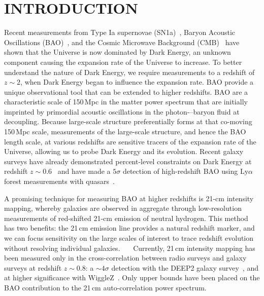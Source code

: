 \documentclass[]{spie}  %
\begin{document}
\section{INTRODUCTION}
\label{sec:intro}  %

Recent measurements from Type Ia supernovae (SN1a)~\cite{SN1a}, Baryon Acoustic Oscillations (BAO)~\cite{2016MNRAS.457.1770C}, and the Cosmic Microwave Background (CMB)~\cite{2015arXiv150201589P} have shown that the Universe is now dominated by Dark Energy, an unknown component causing the expansion rate of the Universe to increase. To better understand the nature of Dark Energy, we require measurements to a redshift of $z\sim2$, when Dark Energy began to influence the expansion rate. BAO provide a unique observational tool that can be extended to higher redshifts. BAO are a characteristic scale of 150\,Mpc in the matter power spectrum that are initially imprinted by primordial acoustic oscillations in the photon-–baryon fluid at decoupling.  Because large-scale structure preferentially forms at that co-moving 150\,Mpc scale, measurements of the large-scale structure, and hence the BAO length scale, at various redshifts are sensitive tracers of the expansion rate of the Universe, allowing us to probe Dark Energy and its evolution.  Recent galaxy surveys have already demonstrated percent-level constraints on Dark Energy at redshift $z\sim0.6$~\cite{2014MNRAS.441...24A} and have made a $5\sigma$ detection of high-redshift BAO using $\mathrm{Ly}\alpha$ forest measurements with quasars~\cite{2015A&A...574A..59D}.\newline

A promising technique for measuring BAO at higher redshifts is 21-cm intensity mapping, whereby galaxies are observed in aggregate through low-resolution measurements of red-shifted 21-cm emission of neutral hydrogen. This method has two benefits: the 21\,cm emission line provides a natural redshift marker, and we can focus sensitivity on the large scales of interest to trace redshift evolution without resolving individual galaxies.~\cite{2015PhRvD..91h3514S}~\cite{2015aska.confE..19S}~\cite{2015ApJ...803...21B} Currently, 21\,cm intensity mapping has been measured only in the cross-correlation between radio surveys and galaxy surveys at redshift $z\sim0.8$: a $\sim4\sigma$ detection with the DEEP2 galaxy survey~\cite{2010arXiv1007.3709C}, and at higher significance with WiggleZ~\cite{2013ApJ...763L..20M}. Only upper bounds have been placed on the BAO contribution to the 21\,cm auto-correlation power spectrum.~\cite{2013MNRAS.434L..46S} \newline
\end{document}
